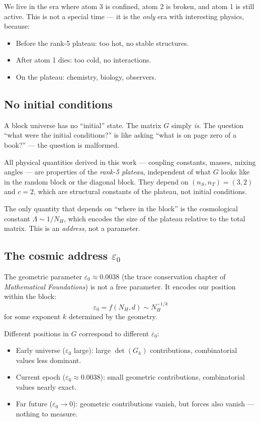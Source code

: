 \documentclass[12pt]{article}
\theoremstyle{remark}
\theoremstyle{definition}
\begin{document}
We live in the era where atom 3 is confined, atom 2 is broken, and atom 1 is still active. This is not a special time --- it is the \emph{only} era with interesting physics, because:
\begin{itemize}
\item Before the rank-5 plateau: too hot, no stable structures.
\item After atom 1 dies: too cold, no interactions.
\item On the plateau: chemistry, biology, observers.
\end{itemize}

\subsection{No initial conditions}

A block universe has no ``initial'' state. The matrix $G$ simply \emph{is}. The question ``what were the initial conditions?'' is like asking ``what is on page zero of a book?'' --- the question is malformed.

All physical quantities derived in this work --- coupling constants, masses, mixing angles --- are properties of the \emph{rank-5 plateau}, independent of what $G$ looks like in the random block or the diagonal block. They depend on $(n_S, n_T) = (3, 2)$ and $c = 2$, which are structural constants of the plateau, not initial conditions.

The only quantity that depends on ``where in the block'' is the cosmological constant $\Lambda \sim 1/N_H$, which encodes the size of the plateau relative to the total matrix. This is an \emph{address}, not a parameter.

\subsection{The cosmic address $\varepsilon_0$}

The geometric parameter $\varepsilon_0 \approx 0.0038$ (the trace conservation chapter of \textit{Mathematical Foundations}) is not a free parameter. It encodes our position within the block:
\begin{equation}
\varepsilon_0 = f(N_H, d) \sim N_H^{-1/k}
\end{equation}
for some exponent $k$ determined by the geometry.

Different positions in $G$ correspond to different $\varepsilon_0$:
\begin{itemize}
\item Early universe ($\varepsilon_0$ large): large $\det(G_h)$ contributions, combinatorial values less dominant.
\item Current epoch ($\varepsilon_0 \approx 0.0038$): small geometric contributions, combinatorial values nearly exact.
\item Far future ($\varepsilon_0 \to 0$): geometric contributions vanish, but forces also vanish --- nothing to measure.
\end{itemize}
\end{document}
